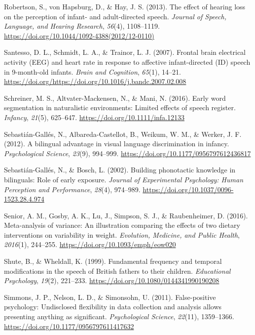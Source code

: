 \documentclass[,man,floatsintext]{apa6}
\begin{document}
\leavevmode\hypertarget{ref-robertson_2013}{}%
Robertson, S., von Hapsburg, D., \& Hay, J. S. (2013). The effect of hearing loss on the perception of infant- and adult-directed speech. \emph{Journal of Speech, Language, and Hearing Research}, \emph{56}(4), 1108--1119. \url{https://doi.org/10.1044/1092-4388(2012/12-0110)}

\leavevmode\hypertarget{ref-santesso_2007}{}%
Santesso, D. L., Schmidt, L. A., \& Trainor, L. J. (2007). Frontal brain electrical activity (EEG) and heart rate in response to affective infant-directed (ID) speech in 9-month-old infants. \emph{Brain and Cognition}, \emph{65}(1), 14--21. \url{https://doi.org/https://doi.org/10.1016/j.bandc.2007.02.008}

\leavevmode\hypertarget{ref-schreiner_2016}{}%
Schreiner, M. S., Altvater-Mackensen, N., \& Mani, N. (2016). Early word segmentation in naturalistic environments: Limited effects of speech register. \emph{Infancy}, \emph{21}(5), 625--647. \url{https://doi.org/10.1111/infa.12133}

\leavevmode\hypertarget{ref-sebastian_galles_2012}{}%
Sebastián-Gallés, N., Albareda-Castellot, B., Weikum, W. M., \& Werker, J. F. (2012). A bilingual advantage in visual language discrimination in infancy. \emph{Psychological Science}, \emph{23}(9), 994--999. \url{https://doi.org/10.1177/0956797612436817}

\leavevmode\hypertarget{ref-sebastian_galles_2002}{}%
Sebastián-Gallés, N., \& Bosch, L. (2002). Building phonotactic knowledge in bilinguals: Role of early exposure. \emph{Journal of Experimental Psychology: Human Perception and Performance}, \emph{28}(4), 974--989. \url{https://doi.org/10.1037/0096-1523.28.4.974}

\leavevmode\hypertarget{ref-senior_2016}{}%
Senior, A. M., Gosby, A. K., Lu, J., Simpson, S. J., \& Raubenheimer, D. (2016). Meta-analysis of variance: An illustration comparing the effects of two dietary interventions on variability in weight. \emph{Evolution, Medicine, and Public Health}, \emph{2016}(1), 244--255. \url{https://doi.org/10.1093/emph/eow020}

\leavevmode\hypertarget{ref-shute_1999}{}%
Shute, B., \& Wheldall, K. (1999). Fundamental frequency and temporal modifications in the speech of British fathers to their children. \emph{Educational Psychology}, \emph{19}(2), 221--233. \url{https://doi.org/10.1080/0144341990190208}

\leavevmode\hypertarget{ref-simmons_2011}{}%
Simmons, J. P., Nelson, L. D., \& Simonsohn, U. (2011). False-positive psychology: Undisclosed flexibility in data collection and analysis allows presenting anything as significant. \emph{Psychological Science}, \emph{22}(11), 1359--1366. \url{https://doi.org/10.1177/0956797611417632}
\end{document}
